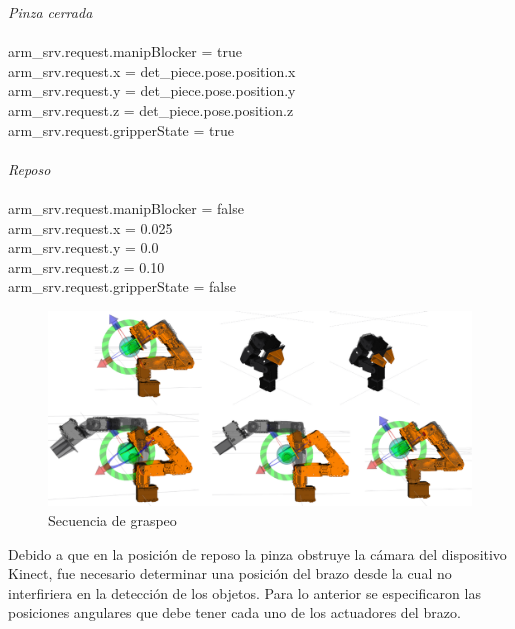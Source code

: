 \begin{center}
    \emph{Pinza cerrada}
        \phantom{holis}\\
        \phantom{holis}\\
        arm\_srv.request.manipBlocker = true\\
        arm\_srv.request.x = det\_piece.pose.position.x\\
        arm\_srv.request.y = det\_piece.pose.position.y\\
        arm\_srv.request.z = det\_piece.pose.position.z\\
        arm\_srv.request.gripperState = true\\
        \phantom{saltodelineaforzado >:D}\\

    \emph{Reposo}
        \phantom{holis}\\
        \phantom{holis}\\
        arm\_srv.request.manipBlocker = false\\
        arm\_srv.request.x = 0.025\\
        arm\_srv.request.y = 0.0\\
        arm\_srv.request.z = 0.10\\
        arm\_srv.request.gripperState = false\\
    \end{center}


\begin{figure}[ht]
    \centering
    \includegraphics[scale=0.2]{Figures/Grasping_sequence.png}
        \caption{Secuencia de graspeo}
        \label{fig:Grasping_Sequence}
\end{figure}

Debido a que en la posición de reposo la pinza obstruye la cámara del dispositivo Kinect, fue necesario determinar una posición del brazo desde la cual no interfiriera en la detección de los objetos. Para lo anterior se especificaron las posiciones angulares que debe tener cada uno de los actuadores del brazo.\\
\phantom{saltodelineaforzado >:D\\}

